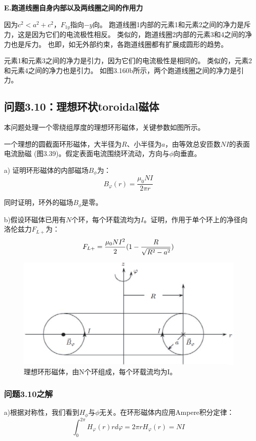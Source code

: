 \textbf{E.跑道线圈自身内部以及两线圈之间的作用力}

因为$c^2 < a^2+c^2$，$F_{1y}$指向$-y$向。
跑道线圈1内部的元素1和元素2之间的净力是斥力，这是因为它们的电流极性相反。
类似的，跑道线圈2内部的元素3和4之间的净力也是斥力。
也即，如无外部约束，各跑道线圈都有扩展成圆形的趋势。

元素1和元素3之间的净力是引力，因为它们的电流极性是相同的。
类似的，元素2和元素4之间的净力也是引力。
如图3.160b所示，两个跑道线圈之间的净力是引力。
\newpage


\subsection{问题3.10：理想环状toroidal磁体}
本问题处理一个零绕组厚度的理想环形磁体，关键参数如图所示。

一个理想的圆截面环形磁体，大半径为$R$、小半径为$a$，由等效总安匝数$NI$的表面电流励磁
(图3.39)。假定表面电流围绕环流动，方向与$\phi$向垂直。

a) 证明环形磁体的内部磁场$B_\phi$为：
\begin{equation}
B_{\varphi}(r)=\frac{\mu_{0}NI}{2\pi r}%
\end{equation}

同时证明，环外的磁场$B_\phi$是零。

b)假设环磁体已用有$N$个环，每个环载流均为$I$。证明，作用于单个环上的净径向洛伦兹力$F_{L+}$为：
\begin{equation}
F_{L+}=\frac{\mu_{0}NI^{2}}{2}(1-\frac{R}{\sqrt{R^{2}-a^{2}}})\\%
\end{equation}
\begin{figure}[htbp]
	\centering
	\includegraphics[scale=0.5]{chpt3/figs/fig3.39.eps}
	\caption{理想环形磁体，由N个环组成，每个环载流均为I。}
\end{figure}

\subsubsection{问题3.10之解}
a)根据对称性，我们看到$H_\phi$与$\phi$无关。在环形磁体内应用Ampere积分定律： 
\begin{equation}
\int_{0}^{2\pi}H_{\varphi}(r)rd\varphi=2\pi rH_{\varphi}(r)=NI%
\end{equation}

